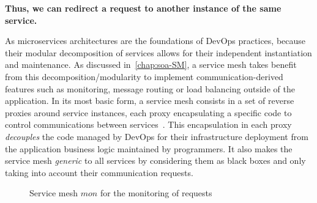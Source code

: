 \begin{tcolorbox}[colframe=CbTeal,colback=CbCyan]
\textbf{Thus, we can redirect a request to another instance of the
  same service.}
\end{tcolorbox}




As microservices architectures are the foundations of \gls{DevOps}
practices, because their modular decomposition of services allows for
their independent instantiation and maintenance.
%
As discussed in~\autoref{chap:soa-SM}, a service mesh takes benefit
from this decomposition/modularity to implement communication-derived
features such as monitoring, message routing or load balancing outside
of the application.
In its most basic form, a service mesh consists in a set of reverse
proxies around service instances, each proxy encapsulating a
specific code to control communications between
services~\cite{LLGZG19}.
%
This encapsulation in each proxy \emph{decouples} the code managed by
\gls{DevOps} for their infrastructure deployment from the application
business logic maintained by programmers.
%
It also makes the service mesh \emph{generic} to all services by
considering them as black boxes and only taking into account their
communication requests.

\begin{figure}[htbp]
  \centering
  \caption{Service mesh $mon$ for the monitoring of requests}
  \label{fig:servicemesh}
\end{figure}


